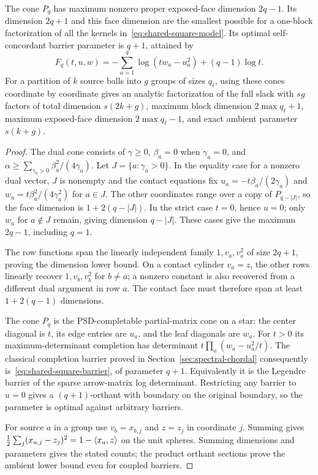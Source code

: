 \begin{proposition}\label{prop:shared-square}
The cone $P_q$ has maximum nonzero proper exposed-face dimension
$2q-1$. Its dimension $2q+1$ and this face dimension are the smallest possible
for a one-block factorization of all the kernels
in~\eqref{eq:shared-square-model}.
Its optimal self-concordant barrier parameter is $q+1$, attained by
\begin{equation}\label{eq:shared-square-barrier}
 F_q(t,u,w)=-\sum_{a=1}^q\log(tw_a-u_a^2)+(q-1)\log t.
\end{equation}
For a partition of $k$ source balls into $g$ groups of sizes $q_\ell$,
using these cones coordinate by coordinate gives an analytic
factorization of the full slack with $sg$ factors of total dimension $s(2k+g)$, maximum block dimension
$2\max q_\ell+1$, maximum exposed-face dimension $2\max q_\ell-1$,
and exact ambient parameter $s(k+g)$.
\end{proposition}
\begin{proof}
The dual cone consists of $\gamma\geq0$, $\beta_a=0$ when
$\gamma_a=0$, and
$\alpha\geq\sum_{\gamma_a>0}\beta_a^2/(4\gamma_a)$.
Let $J=\{a:\gamma_a>0\}$. In the equality case for a nonzero dual
vector, $J$ is nonempty and the contact equations fix
$u_a=-t\beta_a/(2\gamma_a)$ and
$w_a=t\beta_a^2/(4\gamma_a^2)$ for $a\in J$.
The other coordinates range over a copy of $P_{q-|J|}$, so the face
dimension is $1+2(q-|J|)$. In the strict case $t=0$, hence $u=0$;
only $w_a$ for $a\notin J$ remain, giving dimension $q-|J|$.
These cases give the maximum $2q-1$, including $q=1$.

The row functions span the linearly independent family
$1,v_a,v_a^2$ of size $2q+1$, proving the dimension lower bound.
On a contact cylinder $v_a=z$, the other rows linearly recover
$1,v_b,v_b^2$ for $b\ne a$; a nonzero constant is also recovered
from a different dual argument in row $a$. The contact face must
therefore span at least $1+2(q-1)$ dimensions.

The cone $P_q$ is the PSD-completable partial-matrix cone on a star:
the center diagonal is $t$, its edge entries are $u_a$, and the leaf
diagonals are $w_a$. For $t>0$ its maximum-determinant completion
has determinant $t\prod_a(w_a-u_a^2/t)$. The classical completion
barrier proved in Section~\ref{sec:spectral-chordal} consequently
is~\eqref{eq:shared-square-barrier}, of parameter $q+1$.
Equivalently it is the Legendre barrier of the sparse arrow-matrix
log determinant. Restricting any barrier to $u=0$ gives a
$(q+1)$-orthant with boundary on the original boundary, so the
parameter is optimal against arbitrary barriers.

For source $a$ in a group use $v_b=x_{b,j}$ and $z=z_j$ in coordinate
$j$. Summing gives $\tfrac12\sum_j(x_{a,j}-z_j)^2=1-\langle x_a,z\rangle$
on the unit spheres. Summing dimensions and parameters gives the
stated counts; the product orthant sections prove the ambient lower
bound even for coupled barriers.
\end{proof}

